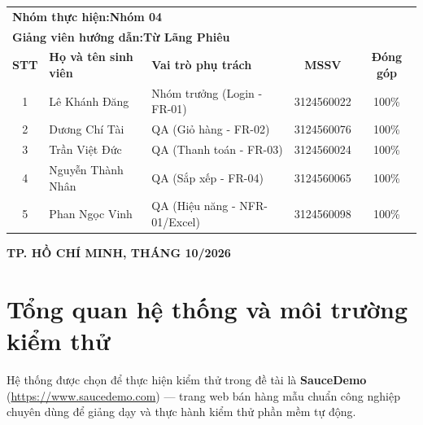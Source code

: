 \documentclass[a4paper]{article}
\begin{document}
\begin{titlepage}
\begin{center}
\begin{tabular}{cllcc}
  \multicolumn{5}{l}{\textbf{Nhóm thực hiện:}\quad \textbf{Nhóm 04}} \\[0.2cm]
  \multicolumn{5}{l}{\textbf{Giảng viên hướng dẫn:}\quad \textbf{Từ Lãng Phiêu}} \\[0.4cm]
  \textbf{STT} & \textbf{Họ và tên sinh viên} & \textbf{Vai trò phụ trách} & \textbf{MSSV} & \textbf{Đóng góp} \\
  \hline
  1 & Lê Khánh Đăng & Nhóm trưởng (Login - FR-01) & 3124560022 & 100\% \\
  2 & Dương Chí Tài & QA (Giỏ hàng - FR-02) & 3124560076 & 100\% \\
  3 & Trần Việt Đức & QA (Thanh toán - FR-03) & 3124560024 & 100\% \\
  4 & Nguyễn Thành Nhân & QA (Sắp xếp - FR-04) & 3124560065 & 100\% \\
  5 & Phan Ngọc Vinh & QA (Hiệu năng - NFR-01/Excel) & 3124560098 & 100\% \\
  \hline
\end{tabular}
\end{center}

\vfill

\begin{center}
  \textbf{TP. HỒ CHÍ MINH, THÁNG 10/2026}
\end{center}
\end{titlepage}

\thispagestyle{empty}
\newpage
\tableofcontents
\newpage

\section{Tổng quan hệ thống và môi trường kiểm thử}
Hệ thống được chọn để thực hiện kiểm thử trong đề tài là \textbf{SauceDemo} (\url{https://www.saucedemo.com}) --- trang web bán hàng mẫu chuẩn công nghiệp chuyên dùng để giảng dạy và thực hành kiểm thử phần mềm tự động.
\end{document}
